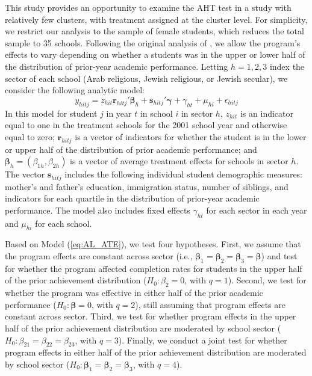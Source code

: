 \documentclass[12pt]{article}\usepackage[]{graphicx}\usepackage[]{color}
\newcommand{\bm}{\mathbf}
\newcommand{\bs}{\boldsymbol}
\begin{document}
This study provides an opportunity to examine the AHT test in a study with relatively few clusters, with treatment assigned at the cluster level.
For simplicity, we restrict our analysis to the sample of female students, which reduces the total sample to 35 schools.
Following the original analysis of \citet{Angrist2009effects}, we allow the program's effects to vary depending on whether a students was in the upper or lower half of the distribution of prior-year academic performance. 
Letting $h = 1,2,3$ index the sector of each school (Arab religious, Jewish religious, or Jewish secular), we consider the following analytic model: 
\begin{equation}
\label{eq:AL_ATE}
y_{hitj} = z_{hit}\bm{r}_{hitj}'\bs\beta_h + \bm{s}_{hitj}'\bs\gamma + \gamma_{ht} + \mu_{hi} + \epsilon_{hitj}
\end{equation}
In this model for student $j$ in year $t$ in school $i$ in sector $h$, $z_{hit}$ is an indicator equal to one in the treatment schools for the 2001 school year and otherwise equal to zero; $\bm{r}_{hitj}$ is a vector of indicators for whether the student is in the lower or upper half of the distribution of prior academic performance; and $\bs\beta_h = \left(\beta_{1h}, \beta_{2h}\right)$ is a vector of average treatment effects for schools in sector $h$. 
The vector $\bm{s}_{hitj}$ includes the following individual student demographic measures: mother's and father's education, immigration status, number of siblings, and indicators for each quartile in the distribution of prior-year academic performance. 
The model also includes fixed effects $\gamma_{ht}$ for each sector in each year and $\mu_{hi}$ for each school. 

Based on Model (\ref{eq:AL_ATE}), we test four hypotheses.%
First, we assume that the program effects are constant across sector (i.e., $\bs\beta_1 = \bs\beta_2 = \bs\beta_3 = \bs\beta$) and test for whether the program affected completion rates for students in the upper half of the prior achievement distribution ($H_0: \beta_2 = 0$, with $q = 1$).
Second, we test for whether the program was effective in either half of the prior academic performance ($H_0: \bs\beta = 0$, with $q = 2$), still assuming that program effects are constant across sector. 
Third, we test for whether program effects in the upper half of the prior achievement distribution are moderated by school sector ($H_0: \beta_{21} = \beta_{22} = \beta_{23}$, with $q = 3$). 
Finally, we conduct a joint test for whether program effects in either half of the prior achievement distribution are moderated by school sector ($H_0: \bs\beta_1 = \bs\beta_2 = \bs\beta_3$, with $q = 4$). 
\end{document}
